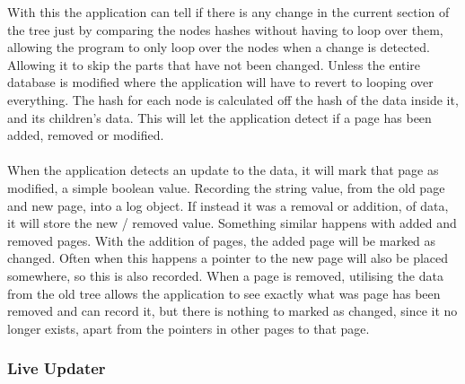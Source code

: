 With this the application can tell if there is any change in the current section of the tree just by comparing the nodes hashes without having to loop over them, allowing the program to only loop over the nodes when a change is detected. Allowing it to skip the parts that have not been changed. Unless the entire database is modified where the application will have to revert to looping over everything. The hash for each node is calculated off the hash of the data inside it, and its children's data. This will let the application detect if a page has been added, removed or modified. 
\\\\
When the application detects an update to the data, it will mark that page as modified, a simple boolean value. Recording the string value, from the old page and new page, into a log object. If instead it was a removal or addition, of data, it will store the new / removed value. Something similar happens with added and removed pages. With the addition of pages, the added page will be marked as changed. Often when this happens a pointer to the new page will also be placed somewhere, so this is also recorded. When a  page is removed, utilising the data from the old tree allows the application to see exactly what was page has been removed and can record it, but there is nothing to marked as changed, since it no longer exists, apart from the pointers in other pages to that page. 

\subsubsection{Live Updater}
\label{subsubsec:live_Updater_imp}

